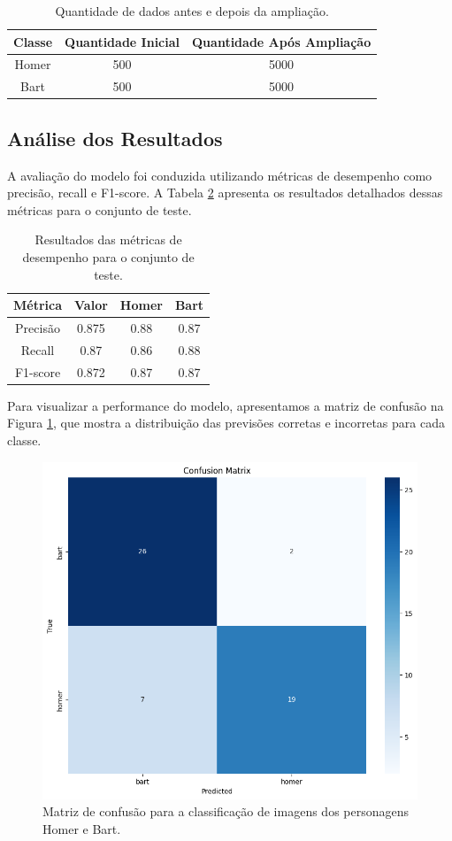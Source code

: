 \documentclass{article}
\begin{document}
\begin{table}[h]
    \centering
    \begin{tabular}{|c|c|c|}
        \hline
        Classe & Quantidade Inicial & Quantidade Após Ampliação \\
        \hline
        Homer & 500 & 5000 \\
        Bart & 500 & 5000 \\
        \hline
    \end{tabular}
    \caption{\label{tab:dados_inicial} Quantidade de dados antes e depois da ampliação.}
\end{table}

\subsection{Análise dos Resultados}

A avaliação do modelo foi conduzida utilizando métricas de desempenho como precisão, recall e F1-score. A Tabela \ref{tab:resultados} apresenta os resultados detalhados dessas métricas para o conjunto de teste.

\begin{table}[h]
    \centering
    \begin{tabular}{|c|c|c|c|}
        \hline
        Métrica & Valor & Homer & Bart \\
        \hline
        Precisão & 0.875 & 0.88 & 0.87 \\
        Recall & 0.87 & 0.86 & 0.88 \\
        F1-score & 0.872 & 0.87 & 0.87 \\
        \hline
    \end{tabular}
    \caption{\label{tab:resultados} Resultados das métricas de desempenho para o conjunto de teste.}
\end{table}

Para visualizar a performance do modelo, apresentamos a matriz de confusão na Figura \ref{fig:matriz_confusao}, que mostra a distribuição das previsões corretas e incorretas para cada classe.

\begin{figure}[h]
    \centering
    \includegraphics[width=0.6\linewidth]{imd_visao/imagens/matriz_confusao.png}
    \caption{\label{fig:matriz_confusao} Matriz de confusão para a classificação de imagens dos personagens Homer e Bart.}
\end{figure}
\end{document}
